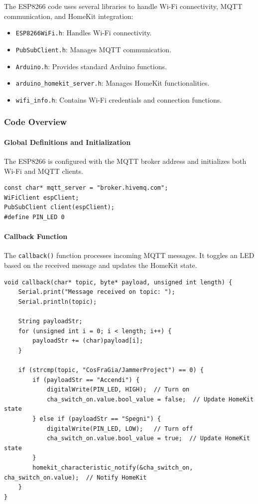 The ESP8266 code uses several libraries to handle Wi-Fi connectivity, MQTT communication, and HomeKit integration:

\begin{itemize}
    \item \texttt{ESP8266WiFi.h}: Handles Wi-Fi connectivity.
    \item \texttt{PubSubClient.h}: Manages MQTT communication.
    \item \texttt{Arduino.h}: Provides standard Arduino functions.
    \item \texttt{arduino\_homekit\_server.h}: Manages HomeKit functionalities.
    \item \texttt{wifi\_info.h}: Contains Wi-Fi credentials and connection functions.
\end{itemize}

\subsubsection{Code Overview}

\paragraph{Global Definitions and Initialization}
The ESP8266 is configured with the MQTT broker address and initializes both Wi-Fi and MQTT clients.

\begin{verbatim}
const char* mqtt_server = "broker.hivemq.com";
WiFiClient espClient;
PubSubClient client(espClient);
#define PIN_LED 0 
\end{verbatim}

\paragraph{Callback Function}
The \texttt{callback()} function processes incoming MQTT messages. It toggles an LED based on the received message and updates the HomeKit state.

\begin{verbatim}
void callback(char* topic, byte* payload, unsigned int length) {
    Serial.print("Message received on topic: ");
    Serial.println(topic);

    String payloadStr;
    for (unsigned int i = 0; i < length; i++) {
        payloadStr += (char)payload[i];
    }

    if (strcmp(topic, "CosFraGia/JammerProject") == 0) {
        if (payloadStr == "Accendi") {
            digitalWrite(PIN_LED, HIGH);  // Turn on
            cha_switch_on.value.bool_value = false;  // Update HomeKit state
        } else if (payloadStr == "Spegni") {
            digitalWrite(PIN_LED, LOW);   // Turn off
            cha_switch_on.value.bool_value = true;  // Update HomeKit state
        }
        homekit_characteristic_notify(&cha_switch_on, cha_switch_on.value);  // Notify HomeKit
    }
}
\end{verbatim}

